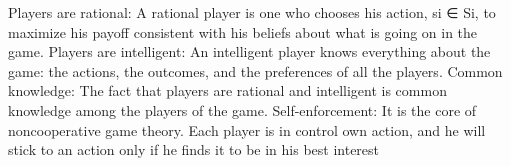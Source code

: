 \documentclass[10pt]{article}
\begin{document}
   Players are rational: A rational player is one who chooses his action,
 si ∈ Si, to maximize his payoff consistent with his beliefs about
 what is going on in the game.
 Players are intelligent: An intelligent player knows everything about
 the game: the actions, the outcomes, and the preferences of all the
 players.
 Common knowledge: The fact that players are rational and
 intelligent is common knowledge among the players of the game.
 Self-enforcement: It is the core of noncooperative game theory.
 Each player is in control own action, and he will stick to an action
 only if he finds it to be in his best interest
\end{document}
